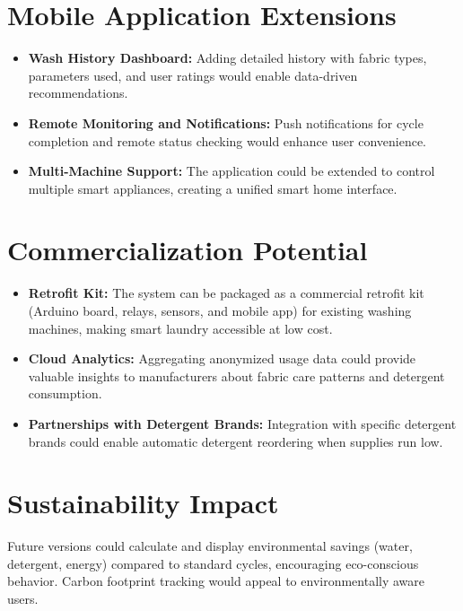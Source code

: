 \section*{Mobile Application Extensions}
\begin{itemize}
    \item \textbf{Wash History Dashboard:} Adding detailed history with fabric types, parameters used, and user ratings would enable data-driven recommendations.
    \item \textbf{Remote Monitoring and Notifications:} Push notifications for cycle completion and remote status checking would enhance user convenience.
    \item \textbf{Multi-Machine Support:} The application could be extended to control multiple smart appliances, creating a unified smart home interface.
\end{itemize}

\section*{Commercialization Potential}
\begin{itemize}
    \item \textbf{Retrofit Kit:} The system can be packaged as a commercial retrofit kit (Arduino board, relays, sensors, and mobile app) for existing washing machines, making smart laundry accessible at low cost.
    \item \textbf{Cloud Analytics:} Aggregating anonymized usage data could provide valuable insights to manufacturers about fabric care patterns and detergent consumption.
    \item \textbf{Partnerships with Detergent Brands:} Integration with specific detergent brands could enable automatic detergent reordering when supplies run low.
\end{itemize}

\section*{Sustainability Impact}
Future versions could calculate and display environmental savings (water, detergent, energy) compared to standard cycles, encouraging eco-conscious behavior. Carbon footprint tracking would appeal to environmentally aware users.